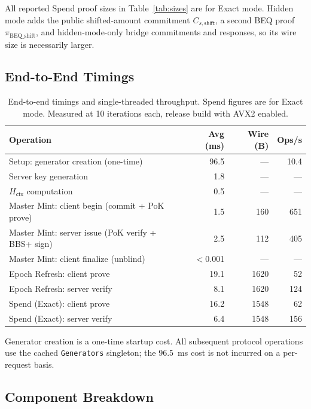 \documentclass[11pt]{article}
\theoremstyle{definitionstyle}
\theoremstyle{plain}
\begin{document}
All reported Spend proof sizes in Table~\ref{tab:sizes} are for Exact mode.
Hidden mode adds the public shifted-amount commitment $C_{s,\mathsf{shift}}$,
a second BEQ proof $\pi_{\text{BEQ\_shift}}$, and hidden-mode-only bridge commitments and responses,
so its wire size is necessarily larger.

\subsection{End-to-End Timings}

\begin{table}[htbp]
\centering
\small
\begin{tabular}{|l|r|r|r|}
\hline
\textbf{Operation} & \textbf{Avg (ms)} & \textbf{Wire (B)} & \textbf{Ops/s} \\
\hline
Setup: generator creation (one-time) & 96.5 & --- & 10.4 \\
Server key generation                &  1.8 & --- & --- \\
$H_{\mathsf{ctx}}$ computation       &  0.5 & --- & --- \\
\hline
Master Mint: client begin (commit + PoK prove)    & 1.5 & 160 & 651 \\
Master Mint: server issue (PoK verify + BBS+ sign)& 2.5 & 112 & 405 \\
Master Mint: client finalize (unblind)            & $<$0.001 & --- & --- \\
\hline
Epoch Refresh: client prove  & 19.1 & 1620 &  52 \\
Epoch Refresh: server verify &  8.1 & 1620 & 124 \\
\hline
Spend (Exact): client prove  & 16.2 & 1548 &  62 \\
Spend (Exact): server verify &  6.4 & 1548 & 156 \\
\hline
\end{tabular}
\caption{End-to-end timings and single-threaded throughput.  Spend figures are
for Exact mode.  Measured at 10 iterations each, release build with AVX2 enabled.}
\label{tab:e2e}
\end{table}

Generator creation is a one-time startup cost.  All subsequent protocol
operations use the cached \texttt{Generators} singleton; the 96.5~ms cost is
not incurred on a per-request basis.

\subsection{Component Breakdown}
\end{document}
